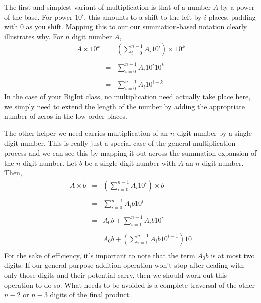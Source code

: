 \documentclass[10pt]{article}
\begin{document}
The first and simplest variant of multiplication is that of a number $A$ by a power of the base. For power $10^i$, this amounts to a shift to the left by $i$ places, padding with $0$ as you shift. Mapping this to our our summation-based notation clearly illustrates why. For $n$ digit number $A$,
\[
\begin{array}{rcl}
A \times 10^k &=& \left( \sum\limits_{i=0}^{n-1}A_i10^i \right) \times 10^k \\ \\
 &=& \sum\limits_{i=0}^{n-1}A_i10^i10^k \\ \\
 &=& \sum\limits_{i=0}^{n-1}A_i10^{i+k}
\end{array}
\]
In the case of your BigInt class, no multiplication need actually take place here, we simply need to extend the length of the number by adding the appropriate number of zeros in the low order places. 

The other helper we need carries multiplication of an $n$ digit number by a single digit number.  This is really just a special case of the general multiplication process and we can see this by mapping it out across the summation expansion of the $n$ digit number. Let $b$ be a single digit number with $A$ an $n$ digit number. Then,
\[
\begin{array}{rcl}
A \times b &=& \left( \sum\limits_{i=0}^{n-1}A_i10^i \right) \times b \\ \\
 &=& \sum\limits_{i=0}^{n-1}A_ib10^i  \\ \\
 &=& A_0b + \sum\limits_{i=1}^{n-1}A_ib10^i \\  \\
 &=& A_0b + \left(\sum\limits_{i=1}^{n-1}A_ib10^{i-1}\right)10 \\
\end{array}
\]
For the sake of efficiency, it's important to note that the term $A_0b$ is at most two digits. If our general purpose addition operation won't stop after dealing with only those digits and their potential carry, then we should work out this operation to do so. What needs to be avoided is a complete traversal of the other $n-2$ or $n-3$ digits of the final product. 
\end{document}
